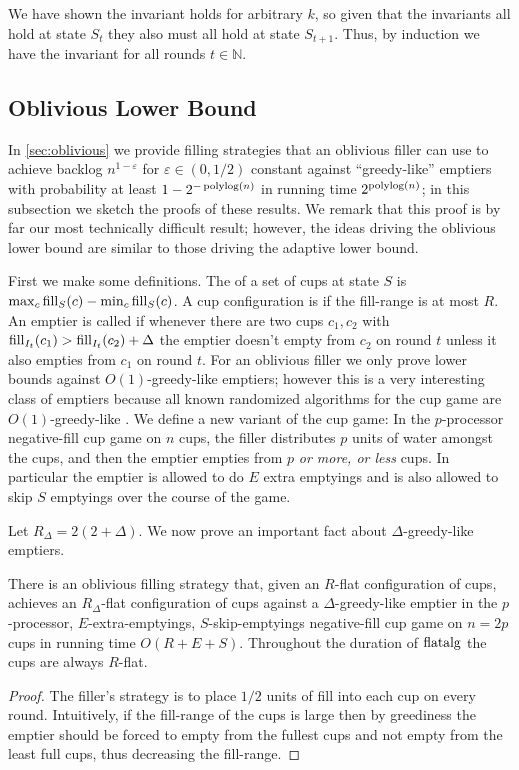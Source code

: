 We have shown the invariant holds for arbitrary $k$, so given that the
invariants all hold at state $S_t$ they also must all hold at state $S_{t+1}$.
Thus, by induction we have the invariant for all rounds $t\in\mathbb{N}$.

\subsection{Oblivious Lower Bound}

In \cref{sec:oblivious} we provide filling strategies that an
oblivious filler can use to achieve backlog $n^{1-\varepsilon}$
for $\varepsilon \in (0, 1/2)$ constant against
\enquote{greedy-like} emptiers with probability at least
$1-2^{-\operatorname{\text{polylog}}(n)}$ in running time $2^{\operatorname{\text{polylog}}(n)}$; in this
subsection we sketch the proofs of these results. We remark that
this proof is by far our most technically difficult result;
however, the ideas driving the oblivious lower bound are similar
to those driving the adaptive lower bound. 

First we make some definitions.
The  of a set of cups at state $S$ is $\max_c
\operatorname{\text{\textup{fill}}}_S(c) - \min_c \operatorname{\text{\textup{fill}}}_S(c)$. A cup configuration is
 if the fill-range is at most $R$. An emptier is
called  if whenever there are two cups $c_1,
c_2$ with $\operatorname{\text{\textup{fill}}}_{I_t}(c_1) > \operatorname{\text{\textup{fill}}}_{I_t}(c_2) + \Delta$ the emptier 
doesn't empty from $c_2$ on round $t$ unless it also empties
from $c_1$ on round $t$. For an oblivious filler we only prove lower bounds
against $O(1)$-greedy-like emptiers; however this is a very 
interesting class of emptiers because all known randomized
algorithms for the cup game are $O(1)$-greedy-like \cite{mbe19, wku20}.
We define a new variant of the cup game: In the $p$-processor
 
negative-fill cup game on $n$ cups, the filler distributes $p$
units of water amongst the cups, and then the emptier empties
from $p$ \textit{or more, or less} cups. In particular the
emptier is allowed to do $E$ extra emptyings and is also allowed
to skip $S$ emptyings over the course of the game.

Let $R_\Delta = 2(2+\Delta)$.
We now prove an important fact about $\Delta$-greedy-like emptiers.
\begin{lemma}
  \label{lem:TO_flatalg}
  There is an oblivious filling strategy  that,
  given an $R$-flat configuration of cups, achieves an
  $R_\Delta$-flat configuration of cups against a
  $\Delta$-greedy-like emptier in the $p$-processor,
  $E$-extra-emptyings, $S$-skip-emptyings negative-fill cup game
  on $n=2p$ cups in running time $O(R+E+S)$. Throughout the
  duration of $\operatorname{\text{\textup{flatalg}}}$ the cups are always $R$-flat.
\end{lemma}
\begin{proof}
  The filler's strategy is to place $1/2$ units of fill into each
  cup on every round.
  Intuitively, if the fill-range of the cups is large then by
  greediness the emptier should be forced to empty from the
  fullest cups and not empty from the least full cups, thus
  decreasing the fill-range.
\end{proof}

